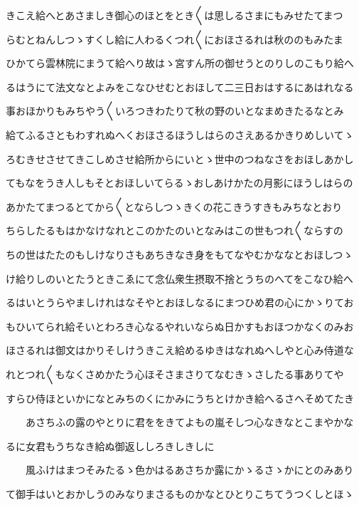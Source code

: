 \documentclass[a4paper,11pt,landscape]{ltjtarticle}
\begin{document}
\par\medskip
きこえ給へとあさましき御心のほとをとき〱は思しるさまにもみせたてまつ
\par\medskip
らむとねんしつゝすくし給に人わるくつれ〱におほさるれは秋ののもみたま
\par\medskip
ひかてら雲林院にまうて給へり故はゝ宮すん所の御せうとのりしのこもり給へ
\par\medskip
るはうにて法文なとよみをこなひせむとおほして二三日おはするにあはれなる
\par\medskip
事おほかりもみちやう〱いろつきわたりて秋の野のいとなまめきたるなとみ
\par\medskip
給てふるさともわすれぬへくおほさるほうしはらのさえあるかきりめしいてゝ
\par\medskip
ろむきせさせてきこしめさせ給所からにいとゝ世中のつねなさをおほしあかし
\par\medskip
てもなをうき人しもそとおほしいてらるゝおしあけかたの月影にほうしはらの
\par\medskip
あかたてまつるとてから〱とならしつゝきくの花こきうすきもみちなとおり
\par\medskip
ちらしたるもはかなけなれとこのかたのいとなみはこの世もつれ〱ならすの
\par\medskip
ちの世はたたのもしけなりさもあちきなき身をもてなやむかななとおほしつゝ
\par\medskip
け給りしのいとたうときこゑにて念仏衆生摂取不捨とうちのへてをこなひ給へ
\par\medskip
るはいとうらやましけれはなそやとおほしなるにまつひめ君の心にかゝりてお
\par\medskip
もひいてられ給そいとわろき心なるやれいならぬ日かすもおほつかなくのみお
\par\medskip
ほさるれは御文はかりそしけうきこえ給めるゆきはなれぬへしやと心み侍道な
\par\medskip
れとつれ〱もなくさめかたう心ほそさまさりてなむきゝさしたる事ありてや
\par\medskip
すらひ侍ほといかになとみちのくにかみにうちとけかき給へるさへそめてたき
\par\medskip
　　あさちふの露のやとりに君ををきてよもの嵐そしつ心なきなとこまやかな
\par\medskip
るに女君もうちなき給ぬ御返ししろきしきしに
\par\medskip
　　風ふけはまつそみたるゝ色かはるあさちか露にかゝるさゝかにとのみあり
\par\medskip
て御手はいとおかしうのみなりまさるものかなとひとりこちてうつくしとほゝ
\par\medskip
\end{document}
